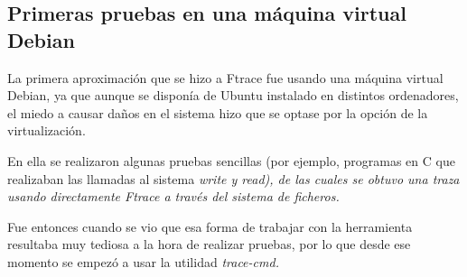 \documentclass[../main.tex]{subfiles}
\begin{document}
\subsection{Primeras pruebas en una máquina virtual Debian}

La primera aproximación que se hizo a Ftrace fue usando una máquina virtual Debian, ya que aunque se disponía de Ubuntu instalado en distintos ordenadores, el miedo a causar daños en el sistema hizo que se optase por la opción de la virtualización.

En ella se realizaron algunas pruebas sencillas (por ejemplo, programas en C que realizaban las llamadas al sistema \it{write} y \it{read}), de las cuales se obtuvo una traza usando directamente Ftrace a través del sistema de ficheros.

Fue entonces cuando se vio que esa forma de trabajar con la herramienta resultaba muy tediosa a la hora de realizar pruebas, por lo que desde ese momento se empezó a usar la utilidad \it{trace-cmd}.
\end{document}
